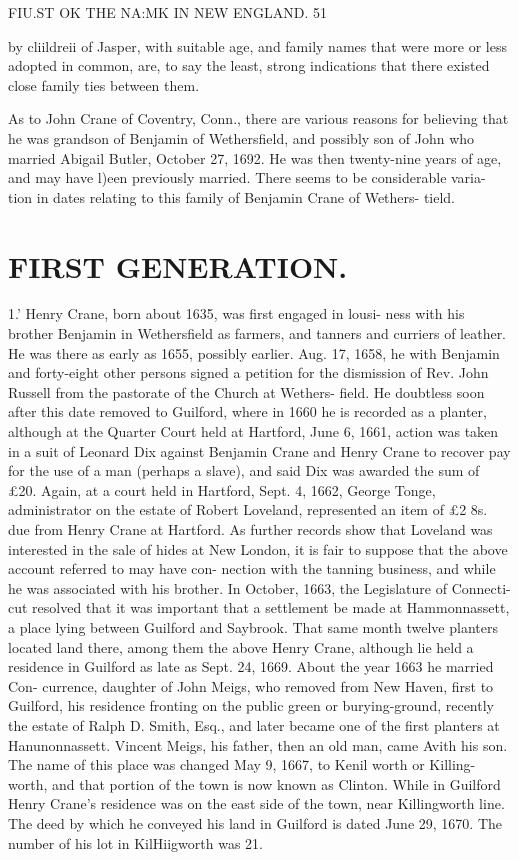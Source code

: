 \documentclass{book}
\begin{document}
FIU.ST OK THE NA:MK IN NEW ENGLAND. 51 

by cliildreii of Jasper, with suitable age, and family names that 
were more or less adopted in common, are, to say the least, 
strong indications that there existed close family ties between 
them. 

As to John Crane of Coventry, Conn., there are various reasons 
for believing that he was grandson of Benjamin of Wethersfield, 
and possibly son of John who married Abigail Butler, October 
27, 1692. He was then twenty-nine years of age, and may have 
l)een previously married. There seems to be considerable varia- 
tion in dates relating to this family of Benjamin Crane of Wethers- 
tield. 



\section{FIRST GENERATION.}


1.' Henry Crane, born about 1635, was first engaged in lousi- 
ness with his brother Benjamin in Wethersfield as farmers, and 
tanners and curriers of leather. He was there as early as 
1655, possibly earlier. Aug. 17, 1658, he with Benjamin and 
forty-eight other persons signed a petition for the dismission of 
Rev. John Russell from the pastorate of the Church at Wethers- 
field. He doubtless soon after this date removed to Guilford, 
where in 1660 he is recorded as a planter, although at the 
Quarter Court held at Hartford, June 6, 1661, action was taken 
in a suit of Leonard Dix against Benjamin Crane and Henry 
Crane to recover pay for the use of a man (perhaps a slave), and 
said Dix was awarded the sum of £20. Again, at a court held 
in Hartford, Sept. 4, 1662, George Tonge, administrator on the 
estate of Robert Loveland, represented an item of £2 8s. due 
from Henry Crane at Hartford. As further records show that 
Loveland was interested in the sale of hides at New London, it is 
fair to suppose that the above account referred to may have con- 
nection with the tanning business, and while he was associated 
with his brother. In October, 1663, the Legislature of Connecti- 
cut resolved that it was important that a settlement be made at 
Hammonnassett, a place lying between Guilford and Saybrook. 
That same month twelve planters located land there, among them 
the above Henry Crane, although lie held a residence in Guilford 
as late as Sept. 24, 1669. About the year 1663 he married Con- 
currence, daughter of John Meigs, who removed from New 
Haven, first to Guilford, his residence fronting on the public 
green or burying-ground, recently the estate of Ralph D. Smith, 
Esq., and later became one of the first planters at Hanunonnassett. 
Vincent Meigs, his father, then an old man, came Avith his son. 
The name of this place was changed May 9, 1667, to Kenil worth 
or Killing-worth, and that portion of the town is now known as 
Clinton. While in Guilford Henry Crane's residence was on the 
east side of the town, near Killingworth line. The deed by which 
he conveyed his land in Guilford is dated June 29, 1670. The 
number of his lot in KilHiigworth was 21. 
\end{document}
